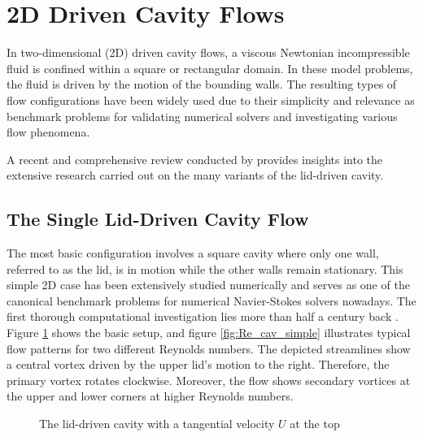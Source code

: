 
\section{2D Driven Cavity Flows} \label{sec:driven_cav}

In two-dimensional (2D) driven cavity flows, a viscous Newtonian incompressible
fluid is confined within a square or rectangular domain. In these model
problems, the fluid is driven by the motion of the bounding walls. The
resulting types of flow configurations have been widely used due to their
simplicity and relevance as benchmark problems for validating numerical solvers
and investigating various flow phenomena.

A recent and comprehensive review conducted by \citet{kuhlmann2019} provides
insights into the extensive research carried out on the many variants of the
lid-driven cavity.

\subsection{The Single Lid-Driven Cavity Flow}

The most basic configuration involves a square cavity where only one wall,
referred to as the lid, is in motion while the other walls remain stationary.
This simple 2D case has been extensively studied numerically and serves as one
of the canonical benchmark problems for numerical Navier-Stokes solvers
nowadays. The first thorough computational investigation lies more than half a
century back \citep{burggraf1966}. Figure \ref{fig:cav_simple} shows the basic
setup, and figure \ref{fig:Re_cav_simple} illustrates typical flow patterns for
two different Reynolds numbers. The depicted streamlines show a central vortex
driven by the upper lid's motion to the right. Therefore, the primary vortex
rotates clockwise. Moreover, the flow shows secondary vortices at the upper and
lower corners at higher Reynolds numbers.

\begin{figure}[ht]
\centering
{}
\caption{The lid-driven cavity with a tangential velocity $U$ at the top}
\label{fig:cav_simple}
\end{figure}

